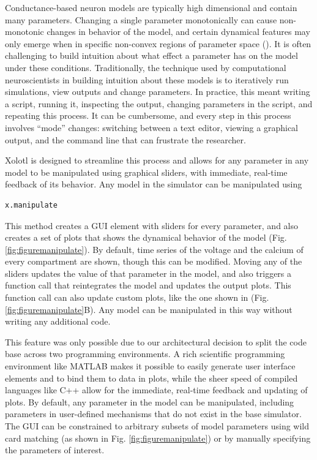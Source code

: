 \documentclass{frontiersSCNS} %
\begin{document}
Conductance-based neuron models are typically high dimensional and contain many parameters. Changing a single parameter monotonically can cause non-monotonic changes in behavior of the model, and certain dynamical features may only emerge when in specific non-convex regions of parameter space (\cite{golowasch2002failure}). It is often challenging to build intuition about what effect a parameter has on the model under these conditions. Traditionally, the technique used by computational neuroscientists in building intuition about these models is to iteratively run simulations, view outputs and change parameters. In practice, this meant writing a script, running it, inspecting the output, changing parameters in the script, and repeating this process. It can be cumbersome, and every step in this process involves ``mode'' changes: switching between a text editor, viewing a graphical output, and the command line that can frustrate the researcher.

Xolotl is designed to streamline this process and allows for any parameter in any model to be manipulated using graphical sliders, with immediate, real-time feedback of its behavior. Any model in the simulator can be manipulated using

\begin{lstlisting}[style=Matlab-editor]
x.manipulate
\end{lstlisting}

This method creates a GUI element with sliders for every parameter, and also creates a set of plots that shows the dynamical behavior of the model (Fig. \ref{fig:figuremanipulate}). By default, time series of the voltage and the calcium of every compartment are shown, though this can be modified. Moving any of the sliders updates the value of that parameter in the model, and also triggers a function call that reintegrates the model and updates the output plots. This function call can also update custom plots, like the one shown in (Fig. \ref{fig:figuremanipulate}B). Any model can be manipulated in this way without writing any additional code.

This feature was only possible due to our architectural decision to split the code base across two programming environments. A rich scientific programming environment like MATLAB makes it possible to easily generate user interface elements and to bind them to data in plots, while the sheer speed of compiled languages like C++ allow for the immediate, real-time feedback and updating of plots. By default, any parameter in the model can be manipulated, including parameters in user-defined mechanisms that do not exist in the base simulator. The GUI can be constrained to arbitrary subsets of model parameters using wild card matching (as shown in Fig. \ref{fig:figuremanipulate}) or by manually specifying the parameters of interest.
\end{document}
